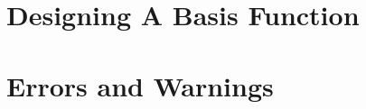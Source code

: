 \documentclass[letterpaper,10pt,english]{sphinxmanual}
\begin{document}
\begin{fulllineitems}
\begin{description}
\end{description}

\end{fulllineitems}



\section{Designing A Basis Function}
\label{\detokenize{source/maxsmooth:designing-a-basis-function}}

\section{Errors and Warnings}
\label{\detokenize{source/maxsmooth:errors-and-warnings}}

\renewcommand{\indexname}{Python Module Index}
\begin{sphinxtheindex}
\let\bigletter\sphinxstyleindexlettergroup
\bigletter{m}
\item\relax{}
\item\relax{}
\end{sphinxtheindex}

\renewcommand{\indexname}{Index}
\printindex
\end{document}
